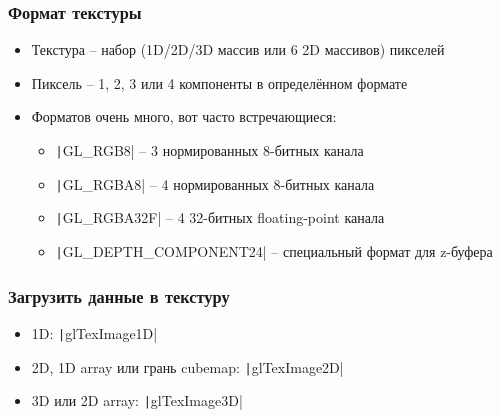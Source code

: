 \documentclass[10pt]{beamer}
\begin{document}
\begin{frame}[fragile]
\frametitle{Формат текстуры}
\begin{itemize}
\item Текстура -- набор (1D/2D/3D массив или 6 2D массивов) пикселей
\pause
\item Пиксель -- 1, 2, 3 или 4 компоненты в определённом формате
\pause
\item Форматов очень много, вот часто встречающиеся:
\begin{itemize}
\item \texttt|GL_RGB8| -- 3 нормированных 8-битных канала
\item \texttt|GL_RGBA8| -- 4 нормированных 8-битных канала
\item \texttt|GL_RGBA32F| -- 4 32-битных floating-point канала
\item \texttt|GL_DEPTH_COMPONENT24| -- специальный формат для z-буфера
\end{itemize}
\end{itemize}
\end{frame}

\begin{frame}[fragile]
\frametitle{Загрузить данные в текстуру}
\begin{itemize}
\item 1D: \texttt|glTexImage1D|
\pause
\item 2D, 1D array или грань cubemap: \texttt|glTexImage2D|
\pause
\item 3D или 2D array: \texttt|glTexImage3D|
\end{itemize}
\end{frame}
\end{document}
